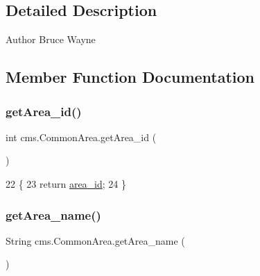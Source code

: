 \subsection{Detailed Description}
\begin{DoxyAuthor}{Author}
Bruce Wayne 
\end{DoxyAuthor}


\subsection{Member Function Documentation}
\mbox{\label{classcms_1_1_common_area_a4402935b233ff59efcdf49e66267572a}} 
\subsubsection{\texorpdfstring{get\+Area\+\_\+id()}{getArea\_id()}}
{\footnotesize\ttfamily int cms.\+Common\+Area.\+get\+Area\+\_\+id (\begin{DoxyParamCaption}{ }\end{DoxyParamCaption})\hspace{0.3cm}{\ttfamily [inline]}}


\begin{DoxyCode}
22                             \{
23         \textcolor{keywordflow}{return} \mbox{\hyperlink{classcms_1_1_common_area_a60b2c63a3a45ca2ac12dc5aa6cd9c8c6}{area\_id}};
24     \}
\end{DoxyCode}
\mbox{\label{classcms_1_1_common_area_a6cf1f28399121fad09549a07ed108326}} 
\subsubsection{\texorpdfstring{get\+Area\+\_\+name()}{getArea\_name()}}
{\footnotesize\ttfamily String cms.\+Common\+Area.\+get\+Area\+\_\+name (\begin{DoxyParamCaption}{ }\end{DoxyParamCaption})\hspace{0.3cm}{\ttfamily [inline]}}


